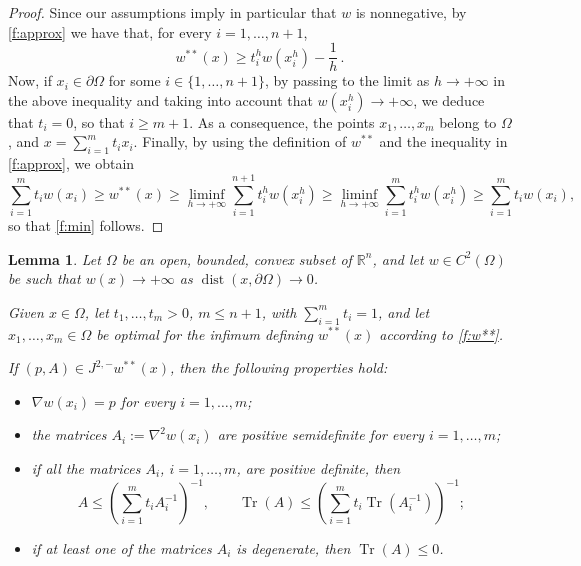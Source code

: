 \documentclass[11pt]{amsart}
\newtheorem{lemma}[theorem]{Lemma}
\theoremstyle{definition}
\theoremstyle{remark}
\def\R{\mathbb{R}}
\def\subjet{J^{2,-}}
\DeclareMathOperator{\dist}{dist}
\DeclareMathOperator{\Tr}{Tr}
\begin{document}
\begin{proof}
Since our assumptions  imply in particular that $w$ is nonnegative,  
by \eqref{f:approx}
we have that, for every $i = 1, \ldots, n+1$,
\[
w^{**}(x)
\geq t^ h_i w(x^h_i) - \frac{1}{h}\,.
\]
Now, if $x_i\in\partial\Omega$ for some $i\in \{1,\ldots, n+1\}$, 
by passing to the limit as $h\to +\infty$ in the above inequality
and taking into account that  $w(x^ h_i) \to +\infty$,
we deduce that $t_i = 0$, so that $i\geq m+1$.
As a consequence, the points $x_1, \ldots, x_m$ belong to $\Omega$,
and $x = \sum_{i=1}^m t_i x_i$.
Finally, by  using the definition of $w^{**}$ and the inequality in \eqref{f:approx}, we obtain
\[
\sum_{i=1}^m t_i w(x_i)
\geq w^{**}(x) \geq
\liminf_{h\to +\infty} \sum_{i=1}^{n+1} t^ h_i w(x^ h_i)
\geq 
\liminf_{h\to +\infty} \sum_{i=1}^{m} t^ h_i w(x^ h_i)
\geq
\sum_{i=1}^{m} t_i w(x_i),
\]
so that \eqref{f:min} follows.
\end{proof}



 
\bigskip
\begin{lemma}
\label{l:ALLp1}
Let $\Omega$ be an open, bounded, convex subset of $\R^n$,  and 
let $w\in C^2(\Omega)$ be such that $w(x) \to +\infty$ as $\dist(x, \partial\Omega) \to 0$.

Given $x\in\Omega$, let $t_1, \ldots, t_m > 0$, $m\leq n+1$, with $\sum_{i=1}^m t_i = 1$,
and let $x_1, \ldots, x_m \in \Omega$ be optimal for the infimum defining $w ^ {**} (x)$ according to \eqref{f:w**}.

If $(p,A) \in \subjet   w^{**}(x)$,  then 
the following properties hold:
\begin{itemize}
\item[(i)] $\nabla w(x_i) = p$
for every $i = 1,\ldots,m$;
\smallskip

\item[(ii)] the matrices $A_i := \nabla ^2 w(x_i)$ are positive semidefinite for every $i = 1,\ldots,m$;
\smallskip

\item[(iii)] if all the matrices $A_i$, $i=1,\ldots,m$, are positive definite,
then
\[
A \leq \left(\sum_{i=1}^m t_i A_i^{-1}\right)^{-1},
\qquad
\Tr(A) \leq 
\left(\sum_{i=1}^m t_i \Tr (A_i^{-1})\right)^{-1};
\]

\item[(iv)] if at least one of the matrices $A_i$ is degenerate, then
$\Tr(A) \leq 0$.
\end{itemize}
\end{lemma}
\end{document}

